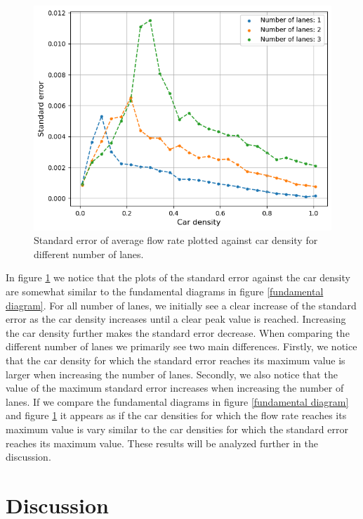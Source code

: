 \documentclass[a4paper,12pt]{article}
\begin{document}
\begin{figure}[H]
    \centering
    \includegraphics[scale=0.9]{Images/standard error 120.png}
    \caption{Standard error of average flow rate plotted against car density for different number of lanes.}
    \label{standard error}
\end{figure}

In figure \ref*{standard error} we notice that the plots of the standard error against the car density are somewhat similar to the fundamental diagrams
in figure \ref*{fundamental diagram}. For all number of lanes, we initially see a clear increase of the standard error as the car density increases
until a clear peak value is reached. Increasing the car density further makes the standard error decrease. When comparing the different number of lanes we primarily
see two main differences. Firstly, we notice that the car density for which the standard error reaches its maximum value is larger when increasing the number of lanes.
Secondly, we also notice that the value of the maximum standard error increases when increasing the number of lanes. If we compare the fundamental
diagrams in figure \ref*{fundamental diagram} and figure \ref*{standard error} it appears as if the car densities for which the flow rate reaches its maximum
value is vary similar to the car densities for which the standard error reaches its maximum value. These results will be analyzed further in the discussion.

\section*{Discussion}
\end{document}
